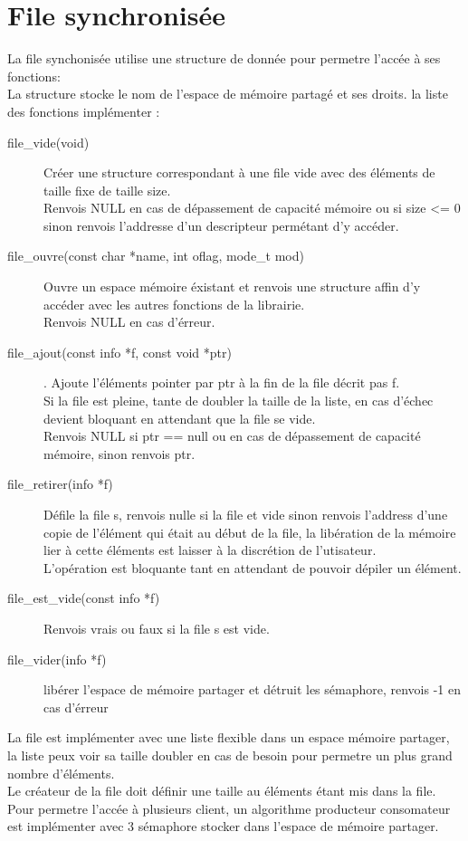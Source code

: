 \documentclass[12pt]{article}
\begin{document}
\section{File synchronisée}
    La file synchonisée utilise une structure de donnée pour permetre l'accée à ses fonctions:\\
    La structure stocke le nom de l'espace de mémoire partagé et ses droits.
    la liste des fonctions implémenter :
    \begin{description}
        \item [file\_vide(void)] Créer une structure correspondant à une file vide avec des éléments de taille
        fixe de taille size.\\
        Renvois NULL en cas de dépassement de capacité mémoire ou si size <= 0\\
        sinon renvois l'addresse d'un descripteur permétant d'y accéder.

        \item [file\_ouvre(const char *name, int oflag, mode\_t mod)] Ouvre un espace mémoire éxistant et renvois une structure affin d'y accéder avec les autres fonctions de la librairie.\\
        Renvois NULL en cas d'érreur.

        \item [file\_ajout(const info *f, const void *ptr)].
        Ajoute l'éléments pointer par ptr à la fin de la file décrit pas f.\\
        Si la file est pleine, tante de doubler la taille de la liste, en cas d'échec\\
        devient bloquant en attendant que la file se vide.\\
        Renvois NULL si ptr == null ou en cas de dépassement de capacité mémoire, sinon renvois ptr.

        \item [file\_retirer(info *f)] Défile la file s, renvois nulle si la file et vide sinon renvois l'address d'une copie de l'élément qui était au début de la file, la libération de la mémoire lier à cette éléments est laisser à la discrétion de l'utisateur.\\
        L'opération est bloquante tant en attendant de pouvoir dépiler un élément.

        \item [file\_est\_vide(const info *f)] Renvois vrais ou faux si la file s est vide.

        \item [file\_vider(info *f)] libérer l'espace de mémoire partager et détruit les sémaphore, renvois -1 en cas d'érreur
    \end{description}
    La file est implémenter avec une liste flexible dans un espace mémoire partager, la liste peux voir sa taille doubler en cas de besoin pour permetre un plus grand nombre d'éléments. \\
    Le créateur de la file doit définir une taille au éléments étant mis dans la file.\\
    Pour permetre l'accée à plusieurs client, un algorithme producteur consomateur est implémenter avec 3 sémaphore stocker dans l'espace de mémoire partager.
\end{document}

